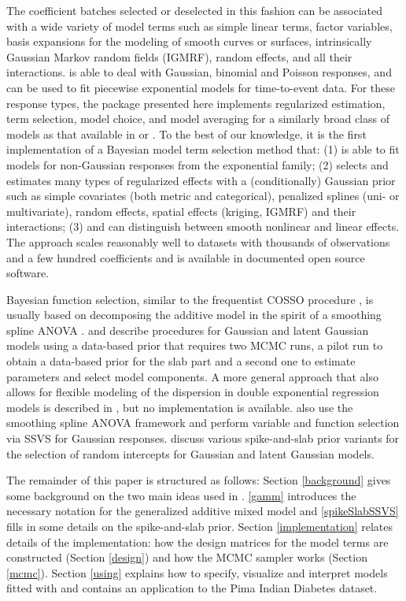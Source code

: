 \documentclass[article, shortnames, nojss, noheadings, notitle]{jss}
\begin{document}
The coefficient batches selected or deselected in this fashion can
be associated with a wide variety of model terms such as simple linear terms,
factor variables, basis expansions for the modeling of smooth
curves or surfaces, intrinsically Gaussian Markov random fields (IGMRF), random effects, and
all their interactions.   is able to deal with Gaussian, binomial and Poisson responses,
and can be used to fit piecewise exponential models for time-to-event data.
For these response types, the package presented here implements regularized estimation,
term selection, model choice, and model averaging for a similarly broad class of models as that
available in  \citep{mboost} or  \citep{bayesx}.
To the best of our knowledge, it is the first implementation of a
Bayesian model term selection method that:
(1) is able to fit models for non-Gaussian responses from the exponential family;
(2) selects and estimates many types of regularized effects with a
(conditionally) Gaussian prior such as simple covariates (both
metric and categorical), penalized splines (uni- or multivariate),
random effects, spatial effects (kriging, IGMRF) and their interactions; (3) and can
distinguish between smooth nonlinear and linear effects.
The approach scales reasonably well to datasets with thousands
of observations and a few hundred coefficients and
is available in documented open source software.

Bayesian function selection, similar to the frequentist COSSO procedure
\citep{Lin:Zhang:2006}, is usually based on decomposing the additive
model in the spirit of a smoothing spline
ANOVA \citep{Wahba:Wang:Gu:1995}. \citet{Wood:Kohn:2002} and
\citet{Yau:Kohn:Wood:2003} describe procedures for Gaussian and
latent Gaussian models using a
data-based prior that requires two MCMC runs, a pilot run to obtain
a data-based prior for the slab part and a second one to
estimate parameters and select model components. A more general
approach that also allows for flexible modeling of the dispersion in double exponential regression
models is described in \citet{Cottet:Kohn:Nott:2008}, but
no implementation is available.
\citet{Reich:Storlie:Bondell:2009} also use the smoothing spline
ANOVA framework and perform variable and function selection via SSVS
for Gaussian responses. \citet{Fruehwirt:Wagner:2010} discuss various spike-and-slab
prior variants for the selection of random intercepts for Gaussian and
latent Gaussian models.

The remainder of this paper is structured as follows:
Section \ref{background} gives some background on the two main ideas used in .
\ref{gamm} introduces the necessary notation for
the generalized additive mixed model and \ref{spikeSlabSSVS} fills in some details on the spike-and-slab prior.
Section \ref{implementation} relates
details of the implementation: how the design matrices for the model terms are constructed (Section \ref{design}) and
how the MCMC sampler works (Section \ref{mcmc}). Section \ref{using} explains how to specify, visualize
and interpret models fitted with  and contains an application to the Pima Indian Diabetes dataset.
\end{document}
